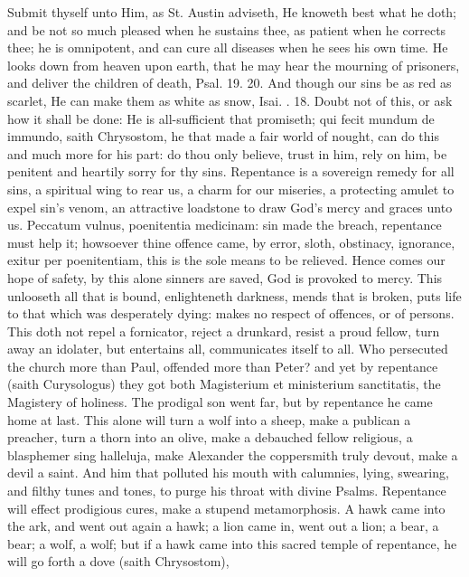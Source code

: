 {Submit thyself unto Him, as St. Austin adviseth, He knoweth best
what he doth; and be not so much pleased when he sustains thee, as
patient when he corrects thee; he is omnipotent, and can cure all
diseases when he sees his own time. He looks down from heaven upon
earth, that he may hear the mourning of prisoners, and deliver the
children of death, Psal.  19. 20. And though our sins be as red as
scarlet, He can make them as white as snow, Isai. . 18. Doubt not of
this, or ask how it shall be done: He is all-sufficient that promiseth;
qui fecit mundum de immundo, saith Chrysostom, he that made a fair
world of nought, can do this and much more for his part: do thou only
believe, trust in him, rely on him, be penitent and heartily sorry for
thy sins. Repentance is a sovereign remedy for all sins, a spiritual
wing to rear us, a charm for our miseries, a protecting amulet to expel
sin's venom, an attractive loadstone to draw God's mercy and graces
unto us. Peccatum vulnus, poenitentia medicinam: sin made the
breach, repentance must help it; howsoever thine offence came, by
error, sloth, obstinacy, ignorance, exitur per poenitentiam, this is
the sole means to be relieved. Hence comes our hope of safety, by
this alone sinners are saved, God is provoked to mercy. This unlooseth
all that is bound, enlighteneth darkness, mends that is broken, puts
life to that which was desperately dying: makes no respect of offences,
or of persons. This doth not repel a fornicator, reject a
drunkard, resist a proud fellow, turn away an idolater, but entertains
all, communicates itself to all. Who persecuted the church more than
Paul, offended more than Peter? and yet by repentance (saith
Curysologus) they got both Magisterium et ministerium sanctitatis, the
Magistery of holiness. The prodigal son went far, but by repentance he
came home at last. This alone will turn a wolf into a sheep, make
a publican a preacher, turn a thorn into an olive, make a debauched
fellow religious, a blasphemer sing halleluja, make Alexander the
coppersmith truly devout, make a devil a saint. And him that
polluted his mouth with calumnies, lying, swearing, and filthy tunes
and tones, to purge his throat with divine Psalms. Repentance will
effect prodigious cures, make a stupend metamorphosis. A hawk came into
the ark, and went out again a hawk; a lion came in, went out a lion; a
bear, a bear; a wolf, a wolf; but if a hawk came into this sacred
temple of repentance, he will go forth a dove (saith Chrysostom),
}
